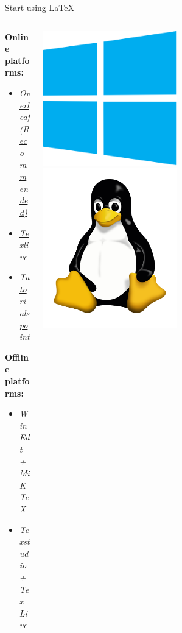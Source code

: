 \documentclass[10pt,xcolor={dvipsnames}]{beamer}
\begin{document}
 		\begin{frame}{Start using \LaTeX}

 			\begin{columns}[T]
 				\begin{column}{.7 \textwidth}
 					\onslide<2->
 					\textbf{Online platforms:}
 					\begin{itemize}[<+->]
 						\item<3-> \href{https://www.overleaf.com/learn/latex/Tutorials}{\textit{Overleaf (Recommended)}} 
 						\item<4-> \href{https://texlive.net/run}{\textit{Texlive}} 
 						\item<5-> \href{https://www.tutorialspoint.com/online_latex_editor.php}{\textit{Tutorialspoint}} 
 					\end{itemize}
 					
 					\vspace{1cm}
 					\textbf{Offline platforms:}
 					\begin{itemize}[<+->]
 						\onslide<7->
 						\item \textit{WinEdt + MiKTeX}
 						\onslide<8->
 						\item \textit{Texstudio + Tex Live } 
 					\end{itemize}

 				\end{column}
 			
 				\begin{column}{.3 \textwidth}
 					\onslide<7->
 					\includegraphics[width=0.5\textwidth]{Images/windows.png}\vspace{1cm}
 					\onslide<8->
 					\includegraphics[width=0.5\textwidth]{Images/linux.png}
 				\end{column}
 				

\end{columns}
\end{frame}
\end{document}
